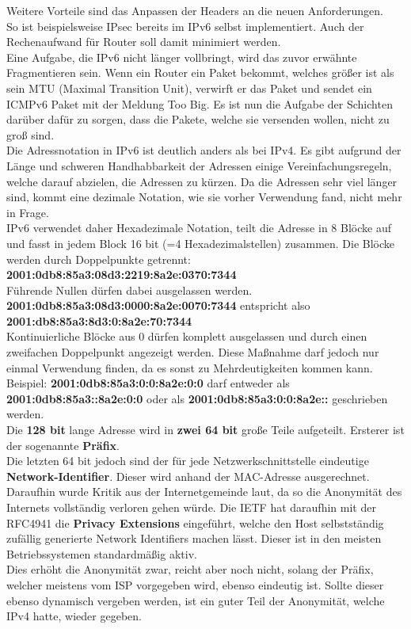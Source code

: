 \documentclass[12pt,a4paper]{report}
\begin{document}
\begin{onehalfspace}
Weitere Vorteile sind das Anpassen der Headers an die neuen Anforderungen.\\
So ist beispielsweise IPsec bereits im IPv6 selbst implementiert. Auch der Rechenaufwand für Router soll damit minimiert werden.\\

Eine Aufgabe, die IPv6 nicht länger vollbringt, wird das zuvor erwähnte Fragmentieren sein. Wenn ein Router ein Paket bekommt, welches größer ist als sein MTU (Maximal Transition Unit), verwirft er das Paket und sendet ein ICMPv6 Paket mit der Meldung \glqq Too Big\grqq . Es ist nun die Aufgabe der Schichten darüber dafür zu sorgen, dass die Pakete, welche sie versenden wollen, nicht zu groß sind.\\

Die Adressnotation in IPv6 ist deutlich anders als bei IPv4. Es gibt aufgrund der Länge und schweren Handhabbarkeit der Adressen einige Vereinfachungsregeln, welche darauf abzielen, die Adressen zu kürzen. Da die Adressen sehr viel länger sind, kommt eine dezimale Notation, wie sie vorher Verwendung fand, nicht mehr in Frage.\\
IPv6 verwendet daher Hexadezimale Notation, teilt die Adresse in 8 Blöcke auf und fasst in jedem Block 16 bit (=4 Hexadezimalstellen) zusammen. Die Blöcke werden durch Doppelpunkte getrennt: \textbf{2001:0db8:85a3:08d3:2219:8a2e:0370:7344}\\
Führende Nullen dürfen dabei ausgelassen werden.\\ \textbf{2001:0db8:85a3:08d3:0000:8a2e:0070:7344} entspricht also\\ \textbf{2001:db8:85a3:8d3:0:8a2e:70:7344}\\
Kontinuierliche Blöcke aus 0 dürfen komplett ausgelassen und durch einen zweifachen Doppelpunkt angezeigt werden. Diese Maßnahme darf jedoch nur einmal Verwendung finden, da es sonst zu Mehrdeutigkeiten kommen kann. Beispiel: \textbf{2001:0db8:85a3:0:0:8a2e:0:0} darf entweder als \textbf{2001:0db8:85a3::8a2e:0:0} oder als \textbf{2001:0db8:85a3:0:0:8a2e::} geschrieben werden.\\

Die \textbf{128 bit} lange Adresse wird in \textbf{zwei 64 bit} große Teile aufgeteilt. Ersterer ist der sogenannte \textbf{Präfix}.\\
Die letzten 64 bit jedoch sind der für jede Netzwerkschnittstelle eindeutige \textbf{Network-Identifier}. Dieser wird anhand der MAC-Adresse ausgerechnet.\\
Daraufhin wurde Kritik aus der Internetgemeinde laut, da so die Anonymität des Internets vollständig verloren gehen würde. Die IETF hat daraufhin mit der RFC4941 die \textbf{Privacy Extensions} eingeführt, welche den Host selbstständig zufällig generierte Network Identifiers machen lässt. Dieser ist in den meisten Betriebssystemen standardmäßig aktiv.\\
Dies erhöht die Anonymität zwar, reicht aber noch nicht, solang der Präfix, welcher meistens vom ISP vorgegeben wird, ebenso eindeutig ist. Sollte dieser ebenso dynamisch vergeben werden, ist ein guter Teil der Anonymität, welche IPv4 hatte, wieder gegeben.\\


\end{onehalfspace}
\end{document}
